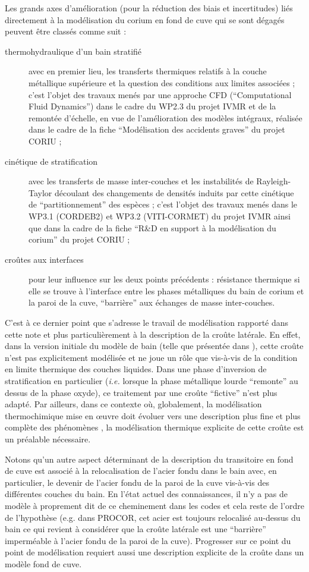 Les grands axes d'amélioration (pour la réduction des biais et incertitudes) liés directement à la modélisation du corium en fond de cuve qui se sont dégagés peuvent être classés comme suit \cite{LeTellier2014,Fichot2018} :
\begin{description}
 \item[thermohydraulique d'un bain stratifié] avec en premier lieu, les transferts thermiques relatifs à la couche métallique supérieure et la question des conditions aux limites associées ; c'est l'objet des travaux menés par une approche CFD (``Computational Fluid Dynamics'') dans le cadre du WP2.3 du projet IVMR et de la remontée d'échelle, en vue de l'amélioration des modèles intégraux, réalisée dans le cadre de la fiche ``Modélisation des accidents graves'' du projet CORIU ; 
 \item[cinétique de stratification] avec les transferts de masse inter-couches et les instabilités de Rayleigh-Taylor découlant des changements de densités induits par cette cinétique de ``partitionnement'' des espèces ; c'est l'objet des travaux menés dans le WP3.1 (CORDEB2) et WP3.2 (VITI-CORMET) du projet IVMR ainsi que dans la cadre de la fiche ``R\&D en support à la modélisation du corium'' du projet CORIU ;
 \item[croûtes aux interfaces] pour leur influence sur les deux points précédents : résistance thermique si elle se trouve à l'interface entre les phases métalliques du bain de corium et la paroi de la cuve, ``barrière'' aux échanges de masse inter-couches.
\end{description}
C'est à ce dernier point que s'adresse le travail de modélisation rapporté dans cette note et plus particulièrement à la description de la croûte latérale. En effet, dans la version initiale du modèle de bain (telle que présentée dans \cite{LeTellier2014}), cette croûte n'est pas explicitement modélisée et ne joue un rôle que vis-à-vis de la condition en limite thermique des couches liquides. Dans une phase d'inversion de stratification en particulier (\textit{i.e.} lorsque la phase métallique lourde ``remonte'' au dessus de la phase oxyde), ce traitement par une croûte ``fictive'' n'est plus adapté. Par ailleurs, dans ce contexte où, globalement, la modélisation thermochimique mise en \oe{}uvre doit évoluer vers une description plus fine et plus complète des phénomènes \cite{Fichot2015}, la modélisation thermique explicite de cette croûte est un préalable nécessaire. 
\begin{remark}
Notons qu'un autre aspect déterminant de la description du transitoire en fond de cuve est associé à la relocalisation de l'acier fondu dans le bain avec, en particulier, le devenir de l'acier fondu de la paroi de la cuve vis-à-vis des différentes couches du bain. En l'état actuel des connaissances, il n'y a pas de modèle à proprement dit de ce cheminement dans les codes et cela reste de l'ordre de l'hypothèse (e.g. dans PROCOR, cet acier est toujours relocalisé au-dessus du bain ce qui revient à considérer que la croûte latérale est une ``barrière'' imperméable à l'acier fondu de la paroi de la cuve). Progresser sur ce point du point de modélisation requiert aussi une description explicite de la croûte dans un modèle fond de cuve.
\end{remark}
